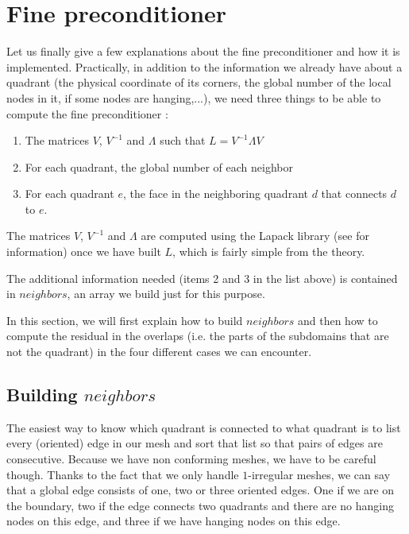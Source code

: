 \section{Fine preconditioner}

Let us finally give a few explanations about the fine preconditioner and how it is implemented. Practically, in addition to the information we already have about a quadrant (the physical coordinate of its corners, the global number of the local nodes in it, if some nodes are hanging,...), we need three things to be able to compute the fine preconditioner : 

\begin{enumerate}
\item The matrices $V$, $V^{-1}$ and $\Lambda$ such that $L=V^{-1}\Lambda V$
\item For each quadrant, the global number of each neighbor
\item For each quadrant $e$, the face in the neighboring quadrant $d$ that connects $d$ to $e$. 
\end{enumerate} 

The matrices $V$, $V^{-1}$ and $\Lambda$ are computed using the Lapack library (see \cite{lapack} for information) once we have built $L$, which is fairly simple from the theory.

The additional information needed (items 2 and 3 in the list above) is contained in $neighbors$, an array we build just for this purpose. 

In this section, we will first explain how to build $neighbors$ and then how to compute the residual in the overlaps (i.e. the parts of the subdomains that are not the quadrant) in the four different cases we can encounter. 


\subsection{Building $neighbors$}

The easiest way to know which quadrant is connected to what quadrant is to list every (oriented) edge in our mesh and sort that list so that pairs of edges are consecutive. Because we have non conforming meshes, we have to be careful though. Thanks to the fact that we only handle $1$-irregular meshes, we can say that a global edge consists of one, two or three oriented edges. One if we are on the boundary, two if the edge connects two quadrants and there are no hanging nodes on this edge, and three if we have hanging nodes on this edge. 

